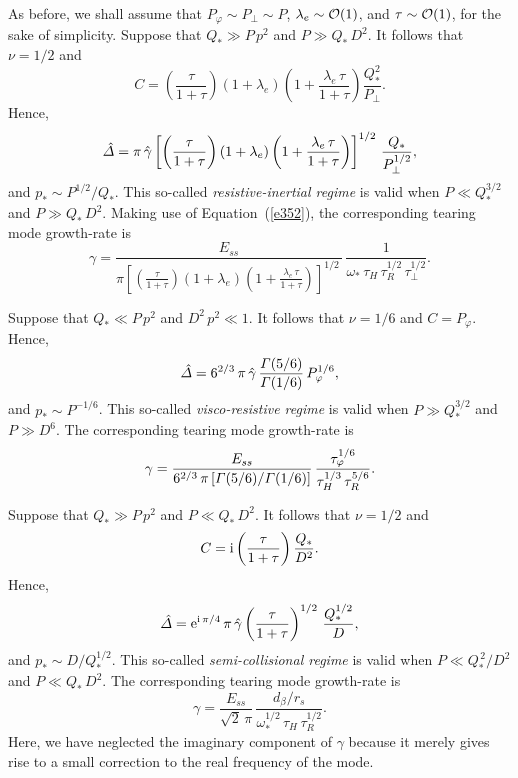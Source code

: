 \documentclass[notitlepage,12pt]{article}
\begin{document}
As before, we shall assume that $P_\varphi\sim P_\perp \sim P$, $\lambda_e\sim{\cal O}(1)$, and $\tau\sim {\cal O}(1)$, for
the sake of simplicity. 
Suppose that $Q_\ast\gg P\,p^2$ and $P\gg Q_\ast\,D^2$. It follows that $\nu=1/2$ and
\begin{equation}
C =\left(\frac{\tau}{1+\tau}\right) (1+\lambda_e)\left(1+\frac{\lambda_e\,\tau}{1+\tau}\right)\frac{Q_\ast^{2}}{P_\perp}.
\end{equation}
Hence, 
\begin{equation}
\hat{\mit\Delta} = \pi\,\hat{\gamma}\left[ \left(\frac{\tau}{1+\tau}\right)(1+\lambda_e)\left(1+\frac{\lambda_e\,\tau}{1+\tau}\right)\right]^{1/2}\,\frac{Q_\ast}{P_\perp^{1/2}},
\end{equation}
and $p_\ast\sim P^{1/2}/Q_\ast$. This so-called {\em resistive-inertial regime}\/ is valid when $P\ll Q_\ast^{3/2}$ and
$P\gg Q_\ast\,D^2$. 
Making use of Equation~(\ref{e352}), the corresponding tearing mode growth-rate is
\begin{equation}\label{e363}
\gamma = \frac{E_{ss}}{\pi\left[ \left(\frac{\tau}{1+\tau}\right)(1+\lambda_e)\left(1+\frac{\lambda_e\,\tau}{1+\tau}\right)\right]^{1/2}\,}\,\frac{1}{\omega_\ast\,\tau_H\,\tau_R^{1/2}\,\tau_\perp^{1/2}}.
\end{equation}

Suppose that $Q_\ast \ll P\,p^2$ and $D^2\,p^2\ll 1$. 
It follows that $\nu=1/6$ and
$C = P_\varphi$. 
Hence, 
\begin{equation}
\hat{\mit\Delta} = 6^{2/3}\,\pi\,\hat{\gamma}\, \frac{{\mit\Gamma}(5/6)}{{\mit\Gamma}(1/6)}\,P_\varphi^{1/6}, 
\end{equation}
and $p_\ast\sim P^{-1/6}$. This so-called {\em visco-resistive regime}\/ is valid when $P\gg Q_\ast^{3/2}$ and
$P\gg D^6$. 
The corresponding tearing mode growth-rate is
\begin{equation}\label{e365}
\gamma = \frac{E_{ss}}{6^{2/3}\,\pi\,[{\mit\Gamma}(5/6)/{\mit\Gamma}(1/6)]}\,\frac{\tau_\varphi^{1/6}}{\tau_H^{1/3}\,\tau_R^{5/6}}.
\end{equation}

Suppose that $Q_\ast\gg P\,p^2$ and $P\ll Q_\ast\,D^2$. It follows that $\nu=1/2$ and
\begin{equation}
C = {\rm i}\left(\frac{\tau}{1+\tau}\right)\frac{Q_\ast}{D^2}.
\end{equation} 
Hence, 
\begin{equation}
\hat{\mit\Delta} = {\rm e}^{{\rm i}\,\pi/4}\,\pi\,\hat{\gamma}\left(\frac{\tau}{1+\tau}\right)^{1/2}\,\frac{Q_\ast^{1/2}}{D},
\end{equation}
and $p_\ast\sim D/Q_\ast^{1/2}$. This so-called {\em semi-collisional regime}\/ is valid when $P\ll Q_\ast^{\,2}/D^2$ and
$P\ll Q_\ast\,D^2$. 
The corresponding tearing mode growth-rate is
\begin{equation}\label{e368}
\gamma = \frac{E_{ss}}{\sqrt{2}\,\pi}\,\frac{d_\beta/r_s}{\omega_\ast^{1/2}\,\tau_H\,\tau_R^{1/2}}.
\end{equation}
Here, we have neglected the imaginary component of $\gamma$ because it merely gives rise to a small correction to the
real frequency of the mode. 
\end{document}
